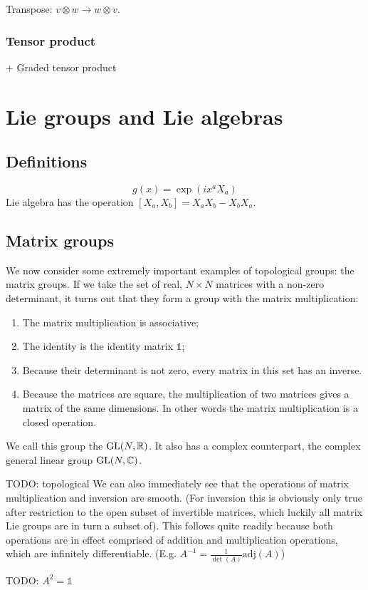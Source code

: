 Transpose: $v\otimes w \to w\otimes v$.

\subsection{Tensor product}
+ Graded tensor product

\chapter{Lie groups and Lie algebras}
\section{Definitions}
\[ g(x) = \exp(ix^aX_a) \]
Lie algebra has the operation $[X_a,X_b]= X_aX_b - X_bX_a$. 
\section{Matrix groups}
We now consider some extremely important examples of topological groups: the matrix groups.
If we take the set of real, $N\times N$ matrices with a non-zero determinant, it turns out that they form a group with the matrix multiplication:
\begin{enumerate}
\item The matrix multiplication is associative;
\item The identity is the identity matrix $\mathbb{1}$;
\item Because their determinant is not zero, every matrix in this set has an inverse.
\item Because the matrices are square, the multiplication of two matrices gives a matrix of the same dimensions. In other words the matrix multiplication is a closed operation.
\end{enumerate}
We call this group the  $\operatorname{GL}(N, \mathbb{R})$. It also has a complex counterpart, the complex general linear group $\operatorname{GL}(N, \mathbb{C})$.

TODO: topological
We can also immediately see that the operations of matrix multiplication and inversion are smooth. (For inversion this is obviously only true after restriction to the open subset of invertible matrices, which luckily all matrix Lie groups are in turn a subset of). This follows quite readily because both operations are in effect comprised of addition and multiplication operations, which are infinitely differentiable. (E.g. $A^{-1} = \frac{1}{\det(A)}\mathrm{adj}(A)$)

\begin{example}
TODO: $A^2 = \mathbb{1}$
\end{example}

